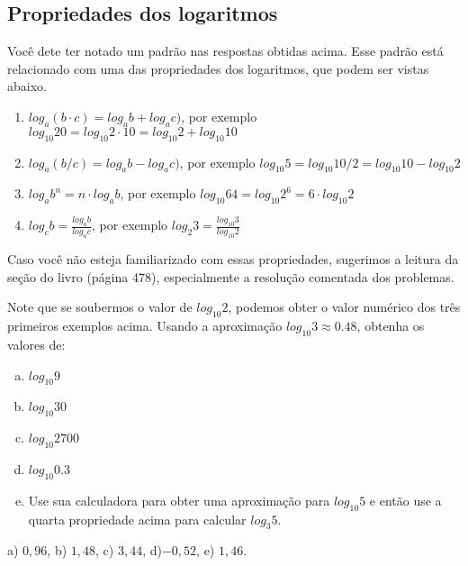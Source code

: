\documentclass[main.tex]{subfiles}
\begin{document}
\subsection*{Propriedades dos logaritmos}

Você dete ter notado um padrão nas respostas obtidas acima. Esse padrão está relacionado com uma das propriedades dos logaritmos, que podem ser vistas abaixo.

\begin{caixaExemplo}
\begin{enumerate}
 \item $log_a (b \cdot c) = log_a b + log_a c)$, por exemplo $log_{10} 20 = log_{10} 2 \cdot 10 = log_{10} 2 + log_{10} 10$
 \item $log_a (b/c) = log_a b - log_a c)$, por exemplo $log_{10} 5 = log_{10} 10/2 = log_{10} 10 - log_{10} 2$
 \item $log_a b^n = n \cdot log_a b$, por exemplo $log_{10} 64 = log_{10} 2^6 = 6 \cdot log_{10} 2$
 \item $log_c b = \frac{log_a b}{log_a c}$, por exemplo $log_2 3 = \frac{log_{10} 3}{log_{10} 2}$
\end{enumerate}
\end{caixaExemplo}

Caso você não esteja familiarizado com essas propriedades, sugerimos a leitura da seção  do livro  (página 478), especialmente a resolução comentada dos problemas.

\begin{questao}
Note que se soubermos o valor de $log_{10} 2$, podemos obter o valor numérico dos três primeiros exemplos acima. Usando a aproximação $log_{10} 3 \approx 0.48$, obtenha os valores de:
\begin{enumerate}[a)]
\item $log_{10} 9$
\item $log_{10} 30$
\item $log_{10} 2700$
\item $log_{10} 0.3$
\item Use sua calculadora para obter uma aproximação para $log_{10} 5$ e então use a quarta propriedade acima para calcular $log_{3} 5$.
\end{enumerate}
\end{questao}

\begin{gabarito}
	\begin{gabaritoQuestao}
		a) $0,96$, b) $1,48$, c) $3,44$, d)$-0,52$, e) $1,46$.
	\end{gabaritoQuestao}
\end{gabarito}
\end{document}
